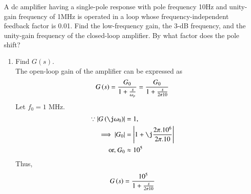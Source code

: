 A dc amplifier having a single-pole response with pole frequency 10Hz and unity-gain frequency of 1MHz is operated in a loop whose frequency-independent feedback factor is 0.01. Find the low-frequency gain, the 3-dB frequency, and the unity-gain frequency of the closed-loop amplifier. By what factor does the pole shift?
\begin{enumerate}[label=\arabic*.,ref=\theenumi]

\item Find $G(s)$.
\\
\solution The open-loop gain of the amplifier can be expressed as
\begin{align}
    G\left(s\right)=\frac{G_{0}}{1+\frac{s}{\omega_p}}=\frac{G_{0}}{1+\frac{s}{2\pi 10}}
\end{align}
%
Let $f_0 = 1$ MHz.
\begin{align}
\because  \abs{G\brak{\j \omega_0}} &=1,
\\
\implies       \abs{G_{0}}&=\abs{1+\j\frac{2\pi.10^6}{2\pi.10}}\\
\text{or, }    G_{0}&\approx10^5
\end{align}
Thus, 
\begin{align}
    G\left(s\right)=\frac{10^5}{1+\frac{s}{2\pi 10}}
\label{eq:ee18btech11035_G}
\end{align}

%


\end{enumerate}
